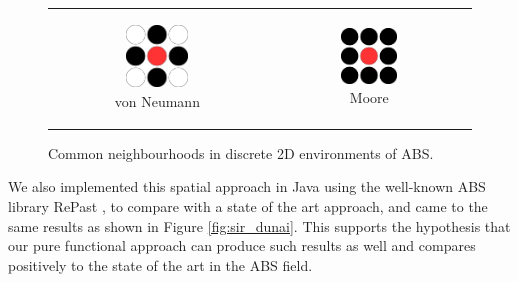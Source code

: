 \begin{figure}
\begin{center}
	\begin{tabular}{c c}
		\begin{subfigure}[b]{0.3\textwidth}
			\centering
			\includegraphics[width=0.5\textwidth, angle=0]{./fig/timedriven/neumann.png}
			\caption{von Neumann}
			\label{fig:neumann_neighbourhood}
		\end{subfigure}
    	&
		\begin{subfigure}[b]{0.3\textwidth}
			\centering
			\includegraphics[width=0.5\textwidth, angle=0]{./fig/timedriven/moore.png}
			\caption{Moore}
			\label{fig:moore_neighbourhood}
		\end{subfigure}
    \end{tabular}
	\caption[Common neighbourhoods in discrete 2D environments of ABS]{Common neighbourhoods in discrete 2D environments of ABS.}
	\label{fig:abs_neighbourhoods}
\end{center}
\end{figure}

We also implemented this spatial approach in Java using the well-known ABS library RePast \cite{north_complex_2013}, to compare with a state of the art approach, and came to the same results as shown in Figure \ref{fig:sir_dunai}. This supports the hypothesis that our pure functional approach can produce such results as well and compares positively to the state of the art in the ABS field.

